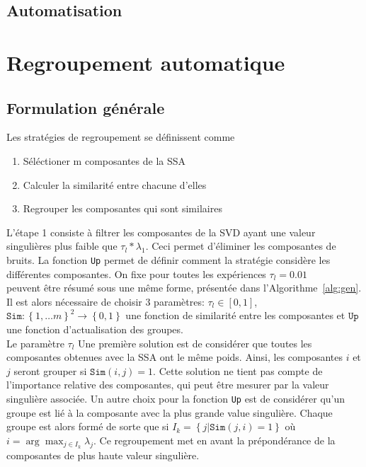 \documentclass{gretsi}
\begin{document}
\subsection{Automatisation}
\label{sub:}


\section{Regroupement automatique}

\subsection{Formulation générale}
\label{sub:form}

Les stratégies de regroupement se définissent comme
\begin{enumerate}
	\item Séléctioner m composantes de la SSA
	\item Calculer la similarité entre chacune d'elles
	\item Regrouper les composantes qui sont similaires
\end{enumerate}
L'étape 1 consiste à filtrer les composantes de la SVD ayant une valeur singulières plus faible que $\tau_l*\lambda_1$. Ceci permet d'éliminer les composantes de bruits. La fonction \texttt{Up} permet de définir comment la stratégie considère les différentes composantes. On fixe pour toutes les expériences $\tau_l = 0.01$\\

peuvent être résumé sous une même forme, présentée dans \mbox{l'Algorithme \ref{alg:gen}}. Il est alors nécessaire de choisir 3 paramètres: $\tau_l \in \left[0, 1\right]$, $\texttt{Sim}: \left \{ 1, \dots m \right \}^2 \to \left \{ 0,1 \right \}$ une fonction de similarité entre les composantes et $\texttt{Up}$ une fonction d'actualisation des groupes.\\


Le paramètre $\tau_l$ Une première solution est de considérer que toutes les composantes obtenues avec la SSA ont le même poids. Ainsi, les composantes $i$ et $j$ seront grouper si $\texttt{Sim}(i, j) = 1$. Cette solution ne tient pas compte de l'importance relative des composantes, qui peut être mesurer par la valeur singulière associée. Un autre choix pour la fonction \texttt{Up} est de considérer qu'un groupe est lié à la composante avec la plus grande value singulière. Chaque groupe est alors formé de sorte que si $I_k = \left\{j | \texttt{Sim}(j, i) = 1\right\}$ où $i = \arg\max_{j\in I_k} \lambda_j$. Ce regroupement met en avant la prépondérance de la composantes de plus haute valeur singulière.\\
\end{document}
